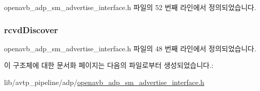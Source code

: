 openavb\+\_\+adp\+\_\+sm\+\_\+advertise\+\_\+interface.\+h 파일의 52 번째 라인에서 정의되었습니다.

\subsubsection[{\texorpdfstring{rcvd\+Discover}{rcvdDiscover}}]{ rcvd\+Discover}\hypertarget{structopenavb__adp__sm__advertise__interface__vars__t_a6bc6c2f6edf5d66acea29a374c0a7a9d}{}\label{structopenavb__adp__sm__advertise__interface__vars__t_a6bc6c2f6edf5d66acea29a374c0a7a9d}


openavb\+\_\+adp\+\_\+sm\+\_\+advertise\+\_\+interface.\+h 파일의 48 번째 라인에서 정의되었습니다.



이 구조체에 대한 문서화 페이지는 다음의 파일로부터 생성되었습니다.\+:\begin{DoxyCompactItemize}
\item 
lib/avtp\+\_\+pipeline/adp/\hyperlink{openavb__adp__sm__advertise__interface_8h}{openavb\+\_\+adp\+\_\+sm\+\_\+advertise\+\_\+interface.\+h}\end{DoxyCompactItemize}
